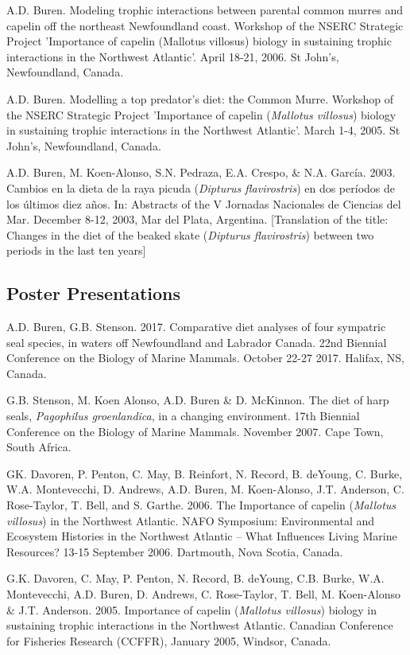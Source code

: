\documentclass{res}
\begin{document}
\begin{resume}
\begin{hangparas}{.4in}{1}
A.D. Buren. Modeling trophic interactions between parental common murres and capelin off the northeast Newfoundland coast. Workshop of the NSERC Strategic Project 'Importance of capelin (Mallotus villosus) biology in sustaining trophic interactions in the Northwest Atlantic'. April 18-21, 2006. St John's, Newfoundland, Canada.

A.D. Buren. Modelling a top predator’s diet: the Common Murre. Workshop of the NSERC Strategic Project 'Importance of capelin (\textit{Mallotus villosus}) biology in sustaining trophic interactions in the Northwest Atlantic'. March 1-4, 2005. St John's, Newfoundland, Canada.

A.D. Buren, M. Koen-Alonso, S.N. Pedraza, E.A. Crespo, \& N.A. García. 2003. Cambios en la dieta de la raya picuda (\textit{Dipturus flavirostris}) en dos per\'{i}odos de los \'{u}ltimos diez a\~{n}os. In: Abstracts of the V Jornadas Nacionales de Ciencias del Mar. December 8-12, 2003, Mar del Plata, Argentina. [Translation of the title: Changes in the diet of the beaked skate (\textit{Dipturus flavirostris}) between two periods in the last ten years]
	
	
\end{hangparas}		
\subsection{Poster Presentations}
\begin{hangparas}{.4in}{1}
A.D. Buren, G.B. Stenson. 2017. Comparative diet analyses of four sympatric seal species, in waters off Newfoundland and Labrador Canada. 22nd Biennial Conference on the Biology of Marine Mammals. October 22-27 2017. Halifax, NS, Canada.

G.B. Stenson, M. Koen Alonso, A.D. Buren \& D. McKinnon. The diet of harp seals, \textit{Pagophilus groenlandica}, in a changing environment. 17th Biennial Conference on the Biology of Marine Mammals. November 2007. Cape Town, South Africa.

GK. Davoren, P. Penton, C. May, B. Reinfort, N. Record, B. deYoung, C. Burke, W.A. Montevecchi, D. Andrews, A.D. Buren, M. Koen-Alonso, J.T. Anderson, C. Rose-Taylor, T. Bell, and S. Garthe. 2006. The Importance of capelin (\textit{Mallotus villosus}) in the Northwest Atlantic. NAFO Symposium: Environmental and Ecosystem Histories in the Northwest Atlantic – What Influences Living Marine Resources? 13-15 September 2006. Dartmouth, Nova Scotia, Canada.

G.K. Davoren, C. May, P. Penton, N. Record, B. deYoung, C.B. Burke, W.A. Montevecchi, A.D. Buren, D. Andrews, C. Rose-Taylor, T. Bell, M. Koen-Alonso \& J.T. Anderson. 2005. Importance of capelin (\textit{Mallotus villosus}) biology in sustaining trophic interactions in the Northwest Atlantic. Canadian Conference for Fisheries Research (CCFFR), January 2005, Windsor, Canada.


\end{hangparas}
\end{resume}
\end{document}
